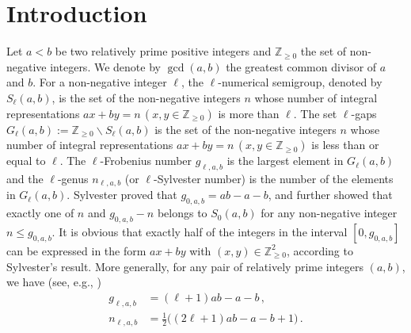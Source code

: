 \documentclass[12pt,a4paper,reqno]{amsart}
\numberwithin{equation}{section}
\def\Z{{\mathbb Z}}
\theoremstyle{plain}
\theoremstyle{definition}
\begin{document}
	
	\section{Introduction}
Let $a<b$ be two relatively prime positive integers and $\Z_{\geq 0}$ the set of non-negative integers. We denote by $\gcd(a,b)$ the greatest common divisor of $a$ and $b$.
For a non-negative integer $\ell$, the $\ell$-numerical semigroup, denoted by $S_\ell(a,b)$, is the set of the non-negative integers $n$ whose number of integral representations $ax+by=n\, (x,y\in\Z_{\geq 0})$ is more than $\ell$. The set $\ell$-gaps  $G_{\ell}(a,b):=\mathbb{Z}_{\geq 0 }\backslash S_{\ell}(a,b)$ is the set of the non-negative integers $n$ whose number of integral representations $ax+by=n\, (x,y\in\Z_{\geq 0})$ is less than or equal to $\ell$. 
The $\ell$-Frobenius number $g_{\ell,a,b}$ is the largest element in $G_{\ell}(a,b)$ and the $\ell$-genus $n_{\ell,a,b}$ (or $\ell$-Sylvester number) is the number of the elements in $G_{\ell}(a,b)$. Sylvester \cite{Sylvester} proved that $g_{0,a,b}=ab-a-b$, and further showed that exactly one of $n$ and $g_{0,a,b}-n$ belongs to $S_{0}(a,b)$ for any non-negative integer $n\leq g_{0,a,b}$. It is obvious that exactly half of the integers in the interval $[0,g_{0,a,b}]$ can be expressed in the form $ax+by$ with $(x,y)\in\Z_{\geq 0}^{2}$, according to Sylvester's result.
More generally, for any pair of relatively prime integers $(a,b)$, we have (see, e.g., \cite[Corollary 2]{Kom2}) 
\begin{align*}
	g_{\ell,a,b}&=(\ell+1)a b-a-b\,,
	\label{p-frob}\\
	n_{\ell,a,b}&=\frac{1}{2}\bigl((2\ell+1)a b-a-b+1\bigr)\,.
\end{align*}
\end{document}
